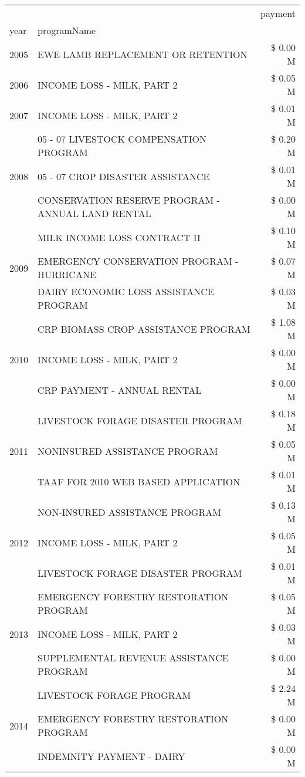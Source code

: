 \begin{tabular}{llr}
\toprule
 &  & payment \\
year & programName &  \\
\midrule
2005 & EWE LAMB REPLACEMENT OR RETENTION & \$ 0.00 M \\
\cline{1-3}
2006 & INCOME LOSS - MILK, PART 2 & \$ 0.05 M \\
\cline{1-3}
2007 & INCOME LOSS - MILK, PART 2 & \$ 0.01 M \\
\cline{1-3}
\multirow[t]{3}{*}{2008} & 05 - 07 LIVESTOCK COMPENSATION PROGRAM & \$ 0.20 M \\
 & 05 - 07 CROP DISASTER ASSISTANCE & \$ 0.01 M \\
 & CONSERVATION RESERVE PROGRAM - ANNUAL LAND RENTAL & \$ 0.00 M \\
\cline{1-3}
\multirow[t]{3}{*}{2009} & MILK INCOME LOSS CONTRACT II & \$ 0.10 M \\
 & EMERGENCY CONSERVATION PROGRAM - HURRICANE & \$ 0.07 M \\
 & DAIRY ECONOMIC LOSS ASSISTANCE PROGRAM & \$ 0.03 M \\
\cline{1-3}
\multirow[t]{3}{*}{2010} & CRP BIOMASS CROP ASSISTANCE PROGRAM & \$ 1.08 M \\
 & INCOME LOSS - MILK, PART 2 & \$ 0.00 M \\
 & CRP PAYMENT - ANNUAL RENTAL & \$ 0.00 M \\
\cline{1-3}
\multirow[t]{3}{*}{2011} & LIVESTOCK FORAGE DISASTER PROGRAM & \$ 0.18 M \\
 & NONINSURED ASSISTANCE PROGRAM & \$ 0.05 M \\
 & TAAF FOR 2010 WEB BASED APPLICATION & \$ 0.01 M \\
\cline{1-3}
\multirow[t]{3}{*}{2012} & NON-INSURED ASSISTANCE PROGRAM & \$ 0.13 M \\
 & INCOME LOSS - MILK, PART 2 & \$ 0.05 M \\
 & LIVESTOCK FORAGE DISASTER PROGRAM & \$ 0.01 M \\
\cline{1-3}
\multirow[t]{3}{*}{2013} & EMERGENCY FORESTRY RESTORATION PROGRAM & \$ 0.05 M \\
 & INCOME LOSS - MILK, PART 2 & \$ 0.03 M \\
 & SUPPLEMENTAL REVENUE ASSISTANCE PROGRAM & \$ 0.00 M \\
\cline{1-3}
\multirow[t]{3}{*}{2014} & LIVESTOCK FORAGE PROGRAM & \$ 2.24 M \\
 & EMERGENCY FORESTRY RESTORATION PROGRAM & \$ 0.00 M \\
 & INDEMNITY PAYMENT - DAIRY & \$ 0.00 M \\

\end{tabular}
